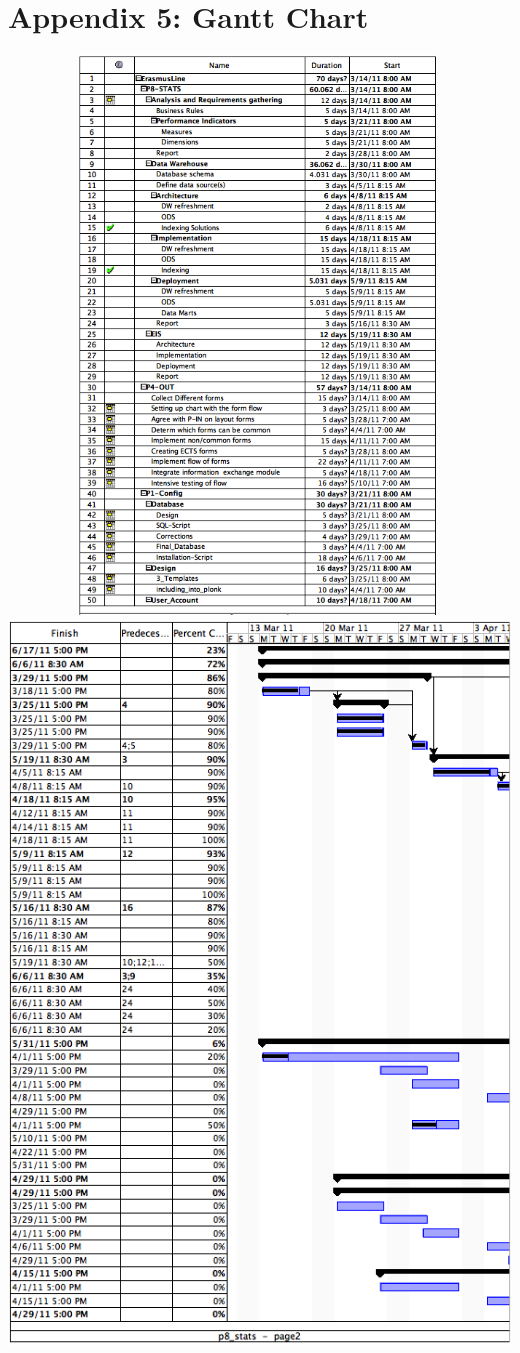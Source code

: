 \chapter{Appendix 5: Gantt Chart}
\includegraphics[width=500px,height=560px]{img/gantt1.png} \newpage
\includegraphics[scale=0.9]{img/gantt2.png} \newpage
